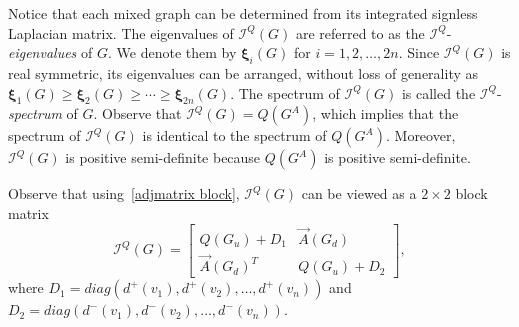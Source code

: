 \documentclass[12pt]{article}
\numberwithin{equation}{section}
\newtheorem{example}{Example}[section]
\begin{document}
	 Notice that each mixed graph can be determined from its integrated signless Laplacian matrix. The eigenvalues of $\mathcal{I}^Q(G)$ are referred to as the $\mathcal{I}^Q$-\textit{eigenvalues} of $G$. We denote them by $\bm{\xi}_i(G)$ for $i=1,2,\ldots,2n$. Since $\mathcal{I}^Q(G)$ is  real symmetric, its eigenvalues can be arranged, without loss of generality as $\bm{\xi}_1(G)\geq\bm{\xi}_2(G)\geq\cdots\geq\bm{\xi}_{2n}(G)$. The spectrum of $\mathcal{I}^Q(G)$ is called the $\mathcal{I}^Q$-\textit{spectrum} of $G$. Observe that  $\mathcal{I}^Q(G)=Q(G^A)$, which implies that the spectrum of $\mathcal{I}^Q(G)$ is identical to the spectrum of $Q(G^A)$. Moreover, $\mathcal{I}^Q(G)$ is positive semi-definite  because $Q(G^A)$ is positive semi-definite. 
	
Observe that using~\eqref{adjmatrix block}, $\mathcal{I}^Q(G)$ can be viewed as a $2\times 2$ block matrix
	\begin{equation}\label{signlessblock}
		\mathcal{I}^Q(G)=\begin{bmatrix}
			Q(G_u)+D_1 & \vec{A}(G_d)\\
			\vec{A}(G_d)^T & Q(G_u)+D_2
		\end{bmatrix},
	\end{equation}
	where $D_1=diag(d^+(v_1),d^+(v_2),\ldots,d^+(v_n))$ and $D_2=diag(d^-(v_1),d^-(v_2),\ldots,d^-(v_n))$. 
	
\end{document}
